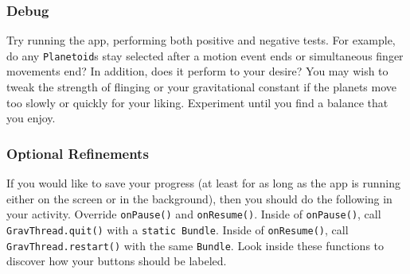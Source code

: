 \subsubsection{Debug}
Try running the app, performing both positive and negative tests.
For example, do any \verb=Planetoid=s stay selected after a motion event ends or simultaneous finger movements end?
In addition, does it perform to your desire?
You may wish to tweak the strength of flinging or your gravitational constant if the planets move too slowly or quickly for your liking.
Experiment until you find a balance that you enjoy.

\subsubsection{Optional Refinements}
If you would like to save your progress (at least for as long as the app is running either on the screen or in the background), then you should do the following in your activity.
Override \verb=onPause()= and \verb=onResume()=. 
Inside of \verb=onPause()=, call \verb=GravThread.quit()= with a \verb=static Bundle=. 
Inside of \verb=onResume()=, call \verb=GravThread.restart()= with the same \verb=Bundle=.
Look inside these functions to discover how your buttons should be labeled.